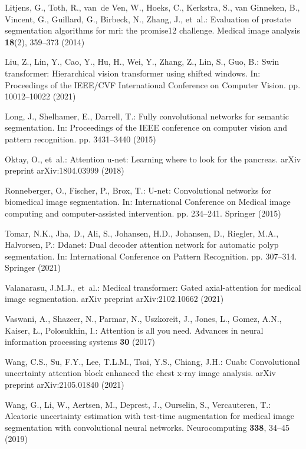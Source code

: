 \documentclass[runningheads]{llncs}
\begin{document}
\begin{thebibliography}{10}
Litjens, G., Toth, R., van~de Ven, W., Hoeks, C., Kerkstra, S., van Ginneken,
  B., Vincent, G., Guillard, G., Birbeck, N., Zhang, J., et~al.: Evaluation of
  prostate segmentation algorithms for mri: the promise12 challenge. Medical
  image analysis  \textbf{18}(2),  359--373 (2014)

Liu, Z., Lin, Y., Cao, Y., Hu, H., Wei, Y., Zhang, Z., Lin, S., Guo, B.: Swin
  transformer: Hierarchical vision transformer using shifted windows. In:
  Proceedings of the IEEE/CVF International Conference on Computer Vision. pp.
  10012--10022 (2021)

Long, J., Shelhamer, E., Darrell, T.: Fully convolutional networks for semantic
  segmentation. In: Proceedings of the IEEE conference on computer vision and
  pattern recognition. pp. 3431--3440 (2015)

Oktay, O., et~al.: Attention u-net: Learning where to look for the pancreas.
  arXiv preprint arXiv:1804.03999  (2018)

Ronneberger, O., Fischer, P., Brox, T.: U-net: Convolutional networks for
  biomedical image segmentation. In: International Conference on Medical image
  computing and computer-assisted intervention. pp. 234--241. Springer (2015)

Tomar, N.K., Jha, D., Ali, S., Johansen, H.D., Johansen, D., Riegler, M.A.,
  Halvorsen, P.: Ddanet: Dual decoder attention network for automatic polyp
  segmentation. In: International Conference on Pattern Recognition. pp.
  307--314. Springer (2021)

Valanarasu, J.M.J., et~al.: Medical transformer: Gated axial-attention for
  medical image segmentation. arXiv preprint arXiv:2102.10662  (2021)

Vaswani, A., Shazeer, N., Parmar, N., Uszkoreit, J., Jones, L., Gomez, A.N.,
  Kaiser, {\L}., Polosukhin, I.: Attention is all you need. Advances in neural
  information processing systems  \textbf{30} (2017)

Wang, C.S., Su, F.Y., Lee, T.L.M., Tsai, Y.S., Chiang, J.H.: Cuab:
  Convolutional uncertainty attention block enhanced the chest x-ray image
  analysis. arXiv preprint arXiv:2105.01840  (2021)

Wang, G., Li, W., Aertsen, M., Deprest, J., Ourselin, S., Vercauteren, T.:
  Aleatoric uncertainty estimation with test-time augmentation for medical
  image segmentation with convolutional neural networks. Neurocomputing
  \textbf{338},  34--45 (2019)


\end{thebibliography}
\end{document}
